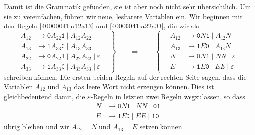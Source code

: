\begin{loesung}
Damit ist die Grammatik gefunden, sie ist aber noch nicht sehr übersichtlich.
Um sie zu vereinfachen, führen wir neue, lesbarere Variablen ein.
Wir beginnen mit den Regeln \eqref{40000041:a12a13} und \eqref{40000041:a22a33},
die wir als
\[
\left.
\begin{aligned}
A_{12}&\to\texttt{0} A_{22}\texttt{1} \;|\; A_{12}A_{22}\\
A_{13}&\to\texttt{1} A_{33}\texttt{0} \;|\; A_{13}A_{33}\\
A_{22}&\to \texttt{0}A_{22}\texttt{1} \;|\; A_{22}A_{22} \;|\; \varepsilon\\
A_{33}&\to \texttt{1}A_{33}\texttt{0} \;|\; A_{33}A_{33} \;|\; \varepsilon
\end{aligned}
\quad
\right\}
\qquad\Rightarrow\qquad
\left\{
\quad
\begin{aligned}
A_{12}&\to\texttt{0} N\texttt{1} \;|\; A_{12}N \\
A_{13}&\to\texttt{1} E\texttt{0} \;|\; A_{13}N \\
N &\to \texttt{0} N \texttt{1} \;|\; NN \;|\; \varepsilon\\
E &\to \texttt{1} E \texttt{0} \;|\; EE \;|\; \varepsilon
\end{aligned}
\right.
\]
schreiben können.
Die ersten beiden Regeln auf der rechten Seite sagen, dass die Variablen
$A_{12}$ und $A_{13}$ das leere Wort nicht erzeugen können.
Dies ist gleichbedeutend damit, die $\varepsilon$-Regeln in letzten zwei 
Regeln wegzulassen, so dass 
\begin{equation}
\begin{aligned}
N &\to \texttt{0} N \texttt{1} \;|\; NN \;|\; \texttt{01}\\
E &\to \texttt{1} E \texttt{0} \;|\; EE \;|\; \texttt{10}
\end{aligned}
\label{40000041:NE}
\end{equation}
übrig bleiben und wir $A_{12}=N$ und $A_{13}=E$ setzen können.


\end{loesung}
